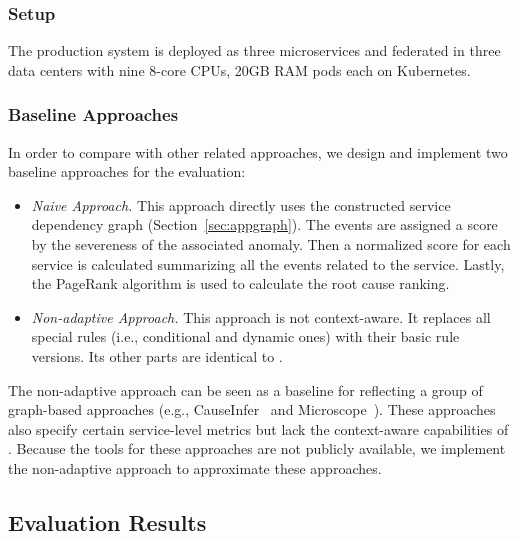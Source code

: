 \subsubsection{\system Setup}

The \system production system is deployed as three microservices and federated in three data centers with nine 8-core CPUs, 20GB RAM pods each on Kubernetes.


\subsubsection{Baseline Approaches} 
\label{sec:baseline}
In order to compare \system with other related approaches, we design and implement two baseline approaches for the evaluation:  
\begin{itemize}
    \item \emph{Naive Approach.} This approach directly uses the constructed service dependency graph (Section~\ref{sec:appgraph}). The events are assigned a score by the severeness of the associated anomaly. Then a normalized score for each service is calculated summarizing all the events related to the service. Lastly, the PageRank algorithm is used to calculate the root cause ranking. 
    \item \emph{Non-adaptive Approach.} This approach is not context-aware. It replaces all special rules (i.e., conditional and dynamic ones) with their basic rule versions. Its other parts are identical to \system.
\end{itemize}
The non-adaptive approach can be seen as a baseline for reflecting a group of graph-based approaches (e.g.,  CauseInfer~\cite{chen2014causeinfer} and Microscope~\cite{lin2018microscope}). These approaches also specify certain service-level metrics but lack the context-aware capabilities of \system. Because the tools for these approaches are not publicly available, we implement the non-adaptive approach to approximate these approaches.%

\subsection{Evaluation Results}

